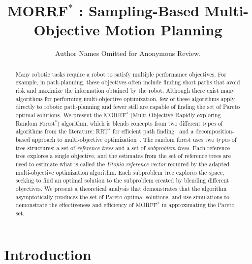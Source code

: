 \documentclass{article}
\title{ MORRF$^{*}$ : Sampling-Based Multi-Objective Motion Planning }
\author{Author Names Omitted for Anonymous Review.}
\begin{document}
\maketitle

\begin{abstract}
Many robotic tasks require a robot to satisfy multiple performance objectives.  
For example, in path-planning, these objectives often include finding short paths that avoid risk and maximize the information obtained by the robot.  
Although there exist many algorithms for performing multi-objective optimization, few of these algorithms apply directly to robotic path-planning and fewer still are capable of finding the set of Pareto optimal solutions.  
We present the MORRF$^{*}$ (Multi-Objective Rapidly exploring Random Forest$^{*}$) algorithm, which is blends concepts from two different types of algorithms from the literature: RRT$^{*}$ for efficient path finding~\cite{Karaman.Frazzoli:RSS10} and a decomposition-based approach to multi-objective optimization~\cite{4358754}.  
The random forest uses two types of tree structures: a set of {\em reference trees} and a set of {\em subproblem trees}.  
Each reference tree explores a single objective, and the estimates from the set of reference trees are used to estimate what is called the {\em Utopia reference vector} required by the adapted multi-objective optimization algorithm.  
Each subproblem tree explores the space, seeking to find an optimal solution to the subproblem created by blending different objectives.  
We present a theoretical analysis that demonstrates that the algorithm asymptotically produces the set of Pareto optimal solutions, and use simulations to demonstrate the effectiveness and efficiency of MORFF$^{*}$ in approximating the Pareto set.
\end{abstract}

\section{Introduction}
\label{sec:intro}
\end{document}
